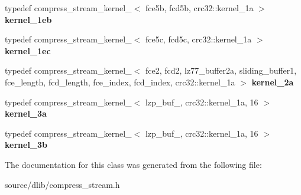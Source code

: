 \begin{DoxyCompactItemize}
\item 
\hypertarget{classdlib_1_1compress__stream_a8e201dfafbdbbc84f27160b63a3d71e4}{
typedef compress\_\-stream\_\-kernel\_$<$ fce5b, fcd5b, crc32::kernel\_\-1a $>$ {\bfseries kernel\_\-1eb}}
\label{classdlib_1_1compress__stream_a8e201dfafbdbbc84f27160b63a3d71e4}

\item 
\hypertarget{classdlib_1_1compress__stream_ae4e15b8daac13f85d03903e788266476}{
typedef compress\_\-stream\_\-kernel\_$<$ fce5c, fcd5c, crc32::kernel\_\-1a $>$ {\bfseries kernel\_\-1ec}}
\label{classdlib_1_1compress__stream_ae4e15b8daac13f85d03903e788266476}

\item 
\hypertarget{classdlib_1_1compress__stream_ae84be8fae8af9200083ca33d2e2bdd61}{
typedef compress\_\-stream\_\-kernel\_$<$ fce2, fcd2, lz77\_\-buffer2a, sliding\_\-buffer1, fce\_\-length, fcd\_\-length, fce\_\-index, fcd\_\-index, crc32::kernel\_\-1a $>$ {\bfseries kernel\_\-2a}}
\label{classdlib_1_1compress__stream_ae84be8fae8af9200083ca33d2e2bdd61}

\item 
\hypertarget{classdlib_1_1compress__stream_a0940b332f05ad0172f55c9925e9187f1}{
typedef compress\_\-stream\_\-kernel\_$<$ lzp\_\-buf\_, crc32::kernel\_\-1a, 16 $>$ {\bfseries kernel\_\-3a}}
\label{classdlib_1_1compress__stream_a0940b332f05ad0172f55c9925e9187f1}

\item 
\hypertarget{classdlib_1_1compress__stream_aed651926e16d3f77d659e116f09baf4d}{
typedef compress\_\-stream\_\-kernel\_$<$ lzp\_\-buf\_, crc32::kernel\_\-1a, 16 $>$ {\bfseries kernel\_\-3b}}
\label{classdlib_1_1compress__stream_aed651926e16d3f77d659e116f09baf4d}

\end{DoxyCompactItemize}


The documentation for this class was generated from the following file:\begin{DoxyCompactItemize}
\item 
source/dlib/compress\_\-stream.h\end{DoxyCompactItemize}
